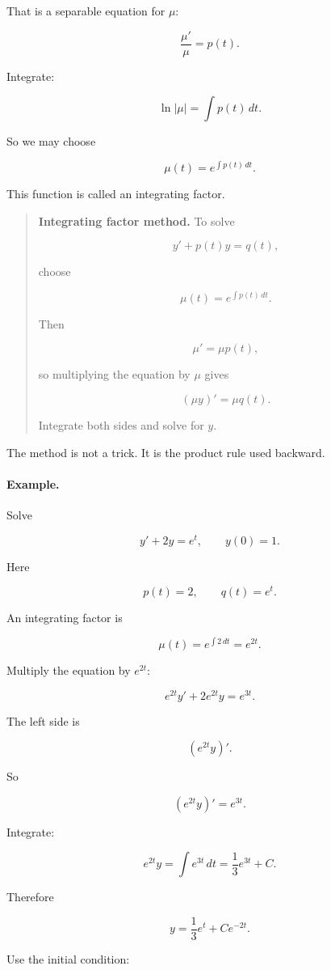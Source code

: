 That is a separable equation for \(\mu\):

\[
\frac{\mu'}{\mu}=p(t).
\]

Integrate:

\[
\ln|\mu|=\int p(t)\,dt.
\]

So we may choose

\[
\boxed{
\mu(t)=e^{\int p(t)\,dt}.
}
\]

This function is called an integrating factor.

\begin{quote}
\textbf{Integrating factor method.}
To solve

\[
y'+p(t)y=q(t),
\]

choose

\[
\boxed{
\mu(t)=e^{\int p(t)\,dt}.
}
\]

Then

\[
\mu'=\mu p(t),
\]

so multiplying the equation by \(\mu\) gives

\[
(\mu y)'=\mu q(t).
\]

Integrate both sides and solve for \(y\).
\end{quote}

The method is not a trick.  It is the product rule used backward.

\paragraph{Example.}
Solve

\[
y'+2y=e^t,
\qquad
y(0)=1.
\]

Here

\[
p(t)=2,
\qquad
q(t)=e^t.
\]

An integrating factor is

\[
\mu(t)=e^{\int 2\,dt}=e^{2t}.
\]

Multiply the equation by \(e^{2t}\):

\[
e^{2t}y'+2e^{2t}y=e^{3t}.
\]

The left side is

\[
(e^{2t}y)'.
\]

So

\[
(e^{2t}y)'=e^{3t}.
\]

Integrate:

\[
e^{2t}y=\int e^{3t}\,dt=\frac13e^{3t}+C.
\]

Therefore

\[
y=\frac13e^t+Ce^{-2t}.
\]

Use the initial condition:

